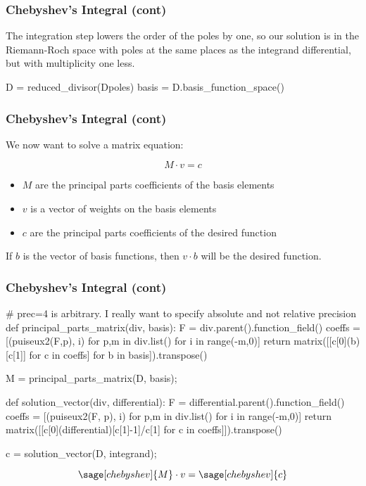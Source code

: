 \documentclass[aspectratio=169,dvipsnames]{beamer}
\begin{document}
\begin{frame}[fragile]
\frametitle{Chebyshev's Integral (cont)}

The integration step lowers the order of the poles by one, so our
solution is in the Riemann-Roch space with poles at the same places as
the integrand differential, but with multiplicity one less.

\begin{sageblock}[chebyshev]
D = reduced_divisor(Dpoles)
basis = D.basis_function_space()
\end{sageblock}

\end{frame}

\begin{frame}[fragile]
\frametitle{Chebyshev's Integral (cont)}

We now want to solve a matrix equation:

$$M \cdot v = c$$

\begin{itemize}
\item $M$ are the principal parts coefficients of the basis elements
\item $v$ is a vector of weights on the basis elements
\item $c$ are the principal parts coefficients of the desired function
\end{itemize}

If $b$ is the vector of basis functions, then $v\cdot b$ will be the desired function.

\end{frame}

\begin{frame}[fragile]
\frametitle{Chebyshev's Integral (cont)}

\begin{sageblock}[chebyshev]
# prec=4 is arbitrary.  I really want to specify absolute and not relative precision
def principal_parts_matrix(div, basis):
    F = div.parent().function_field()
    coeffs = [(puiseux2(F,p), i) for p,m in div.list() for i in range(-m,0)]
    return matrix([[c[0](b)[c[1]] for c in coeffs] for b in basis]).transpose()

M = principal_parts_matrix(D, basis);

def solution_vector(div, differential):
    F = differential.parent().function_field()
    coeffs = [(puiseux2(F, p), i) for p,m in div.list() for i in range(-m,0)]
    return matrix([[c[0](differential)[c[1]-1]/c[1] for c in coeffs]]).transpose()

c = solution_vector(D, integrand);
\end{sageblock}

\bigskip
\tiny
\[ \sage[chebyshev]{M} \cdot v = \sage[chebyshev]{c} \]

\end{frame}
\end{document}
